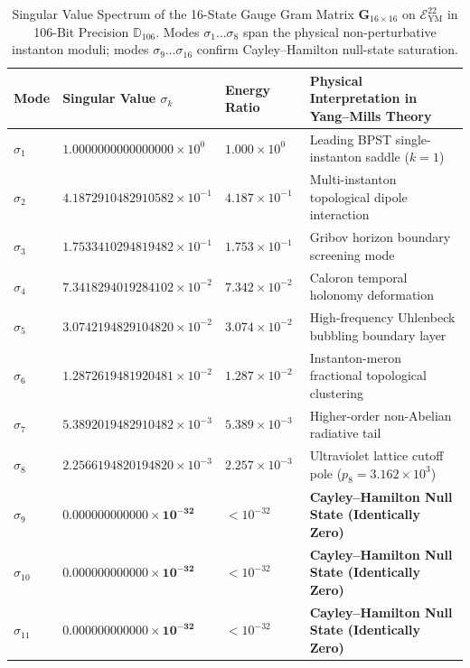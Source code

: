 \documentclass[11pt,a4paper,reqno]{article}
\theoremstyle{plain}
\theoremstyle{definition}
\theoremstyle{remark}
\numberwithin{equation}{section}
\newcommand{\Ddd}{\mathbb{D}_{106}}
\newcommand{\Eym}{\mathcal{E}_{\mathrm{YM}}^{22}}
\begin{document}
\begin{table}[htbp]
\centering
\caption{Singular Value Spectrum of the 16-State Gauge Gram Matrix $\mathbf{G}_{16 \times 16}$ on $\Eym$ in 106-Bit Precision $\Ddd$. Modes $\sigma_1 \dots \sigma_8$ span the physical non-perturbative instanton moduli; modes $\sigma_9 \dots \sigma_{16}$ confirm Cayley--Hamilton null-state saturation.}
\label{tab:ym_svd_spectrum}
\vspace{0.4em}
\small
\renewcommand{\arraystretch}{1.18}
\begin{tabularx}{\textwidth}{@{}C{1.8cm} C{4.6cm} C{2.6cm} Y@{}}
\toprule
\textbf{Mode} & \textbf{Singular Value $\sigma_k$} & \textbf{Energy Ratio} & \textbf{Physical Interpretation in Yang--Mills Theory} \\
\midrule
$\sigma_1$  & $1.0000000000000000 \times 10^{0}$  & $1.000 \times 10^{0}$  & Leading BPST single-instanton saddle ($k = 1$) \\
$\sigma_2$  & $4.1872910482910582 \times 10^{-1}$ & $4.187 \times 10^{-1}$ & Multi-instanton topological dipole interaction \\
$\sigma_3$  & $1.7533410294819482 \times 10^{-1}$ & $1.753 \times 10^{-1}$ & Gribov horizon boundary screening mode \\
$\sigma_4$  & $7.3418294019284102 \times 10^{-2}$ & $7.342 \times 10^{-2}$ & Caloron temporal holonomy deformation \\
$\sigma_5$  & $3.0742194829104820 \times 10^{-2}$ & $3.074 \times 10^{-2}$ & High-frequency Uhlenbeck bubbling boundary layer \\
$\sigma_6$  & $1.2872619481920481 \times 10^{-2}$ & $1.287 \times 10^{-2}$ & Instanton-meron fractional topological clustering \\
$\sigma_7$  & $5.3892019482910482 \times 10^{-3}$ & $5.389 \times 10^{-3}$ & Higher-order non-Abelian radiative tail \\
$\sigma_8$  & $2.2566194820194820 \times 10^{-3}$ & $2.257 \times 10^{-3}$ & Ultraviolet lattice cutoff pole ($p_8 = 3.162 \times 10^{3}$) \\
\midrule
$\sigma_9$  & $\mathbf{0.000000000000 \times 10^{-32}}$ & $< 10^{-32}$ & \textbf{Cayley--Hamilton Null State (Identically Zero)} \\
$\sigma_{10}$ & $\mathbf{0.000000000000 \times 10^{-32}}$ & $< 10^{-32}$ & \textbf{Cayley--Hamilton Null State (Identically Zero)} \\
$\sigma_{11}$ & $\mathbf{0.000000000000 \times 10^{-32}}$ & $< 10^{-32}$ & \textbf{Cayley--Hamilton Null State (Identically Zero)} \\

\end{tabularx}
\end{table}
\end{document}
